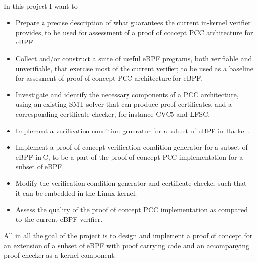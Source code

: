 \documentclass[12pt, a4paper, titlepage, oneside]{article}
\begin{document}
\paragraph{}
\noindent
In this project I want to
\begin{itemize}
\item Prepare a precise description of what guarantees the current in-kernel verifier provides, to be used for assessment of a proof of concept PCC architecture for eBPF. 
\item Collect and/or construct a suite of useful eBPF programs, both verifiable and unverifiable, that exercise most of the current verifier; to be used as a baseline for assesment of proof of concept PCC architecture for eBPF. 
\item Investigate and identify the necessary components of a PCC architecture, using an existing SMT solver that can produce proof certificates, and a corresponding certificate checker, for instance CVC5 and LFSC.
\item Implement a verification condition generator for a subset of eBPF in Haskell.
\item Implement a proof of concept verification condition generator for a subset of eBPF in C, to be a part of the proof of concept PCC implementation for a subset of eBPF.
\item Modify the verification condition generator and certificate checker such that it can be embedded  in the Linux kernel.
\item Assess the quality of the proof of concept PCC implementation as compared to the current eBPF verifier.
\end{itemize}

All in all the goal of the project is to design and implement a proof of concept for an extension of a subset of eBPF with proof carrying code and an accompanying proof checker as a kernel component.


\end{document}
